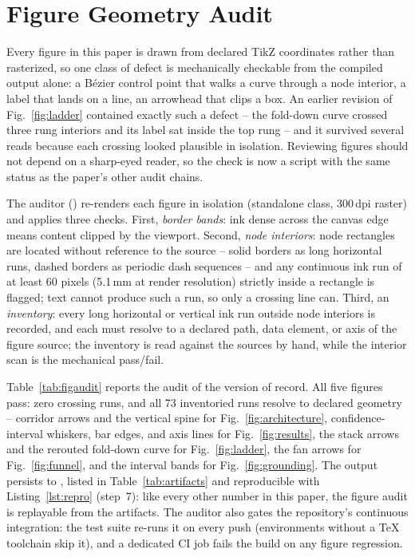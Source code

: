 \section{Figure Geometry Audit}
\label{app:figaudit}
Every figure in this paper is drawn from declared TikZ coordinates
rather than rasterized, so one class of defect is mechanically
checkable from the compiled output alone: a B\'ezier control point that
walks a curve through a node interior, a label that lands on a line, an
arrowhead that clips a box. An earlier revision of
Fig.~\ref{fig:ladder} contained exactly such a defect -- the fold-down
curve crossed three rung interiors and its label sat inside the top
rung -- and it survived several reads because each crossing looked
plausible in isolation. Reviewing figures should not depend on a
sharp-eyed reader, so the check is now a script with the same status as
the paper's other audit chains.

The auditor () re-renders each
figure in isolation (standalone class, 300\,dpi raster) and applies
three checks. First, \emph{border bands}: ink dense across the canvas
edge means content clipped by the viewport. Second, \emph{node
interiors}: node rectangles are located without reference to the source
-- solid borders as long horizontal runs, dashed borders as periodic
dash sequences -- and any continuous ink run of at least 60 pixels
(5.1\,mm at render resolution) strictly inside a rectangle is flagged;
text cannot produce such a run, so only a crossing line can. Third, an
\emph{inventory}: every long horizontal or vertical ink run outside
node interiors is recorded, and each must resolve to a declared path,
data element, or axis of the figure source; the inventory is read
against the sources by hand, while the interior scan is the mechanical
pass/fail.

Table~\ref{tab:figaudit} reports the audit of the version of record.
All five figures pass: zero crossing runs, and all 73 inventoried runs
resolve to declared geometry -- corridor arrows and the vertical spine
for Fig.~\ref{fig:architecture}, confidence-interval whiskers, bar
edges, and axis lines for Fig.~\ref{fig:results}, the stack arrows and
the rerouted fold-down curve for Fig.~\ref{fig:ladder}, the fan arrows
for Fig.~\ref{fig:funnel}, and the interval bands for
Fig.~\ref{fig:grounding}. The output persists to
, listed in
Table~\ref{tab:artifacts} and reproducible with Listing~\ref{lst:repro}
(step~7): like every other number in this paper, the figure audit is
replayable from the artifacts. The auditor also gates the repository's
continuous integration: the test suite re-runs it on every push
(environments without a TeX toolchain skip it), and a dedicated CI job
fails the build on any figure regression.

